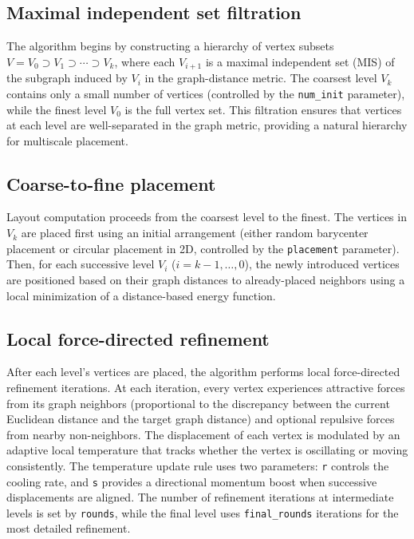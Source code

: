 \subsection{Maximal independent set filtration}\label{maximal-independent-set-filtration}

The algorithm begins by constructing a hierarchy of vertex subsets
\(V = V_0 \supset V_1 \supset \cdots \supset V_k\), where each \(V_{i+1}\) is a
maximal independent set (MIS) of the subgraph induced by \(V_i\) in the
graph-distance metric. The coarsest level \(V_k\) contains only a small number
of vertices (controlled by the \texttt{num\_init} parameter), while the finest level
\(V_0\) is the full vertex set. This filtration ensures that vertices at each
level are well-separated in the graph metric, providing a natural hierarchy
for multiscale placement.

\subsection{Coarse-to-fine placement}\label{coarse-to-fine-placement}

Layout computation proceeds from the coarsest level to the finest. The
vertices in \(V_k\) are placed first using an initial arrangement (either
random barycenter placement or circular placement in 2D, controlled by the
\texttt{placement} parameter). Then, for each successive level \(V_i\) (\(i = k-1,
\ldots, 0\)), the newly introduced vertices are positioned based on their
graph distances to already-placed neighbors using a local minimization of a
distance-based energy function.

\subsection{Local force-directed refinement}\label{local-force-directed-refinement}

After each level's vertices are placed, the algorithm performs local
force-directed refinement iterations. At each iteration, every vertex
experiences attractive forces from its graph neighbors (proportional to the
discrepancy between the current Euclidean distance and the target graph
distance) and optional repulsive forces from nearby non-neighbors. The
displacement of each vertex is modulated by an adaptive local temperature
that tracks whether the vertex is oscillating or moving consistently. The
temperature update rule uses two parameters: \texttt{r} controls the cooling rate,
and \texttt{s} provides a directional momentum boost when successive displacements
are aligned. The number of refinement iterations at intermediate levels is
set by \texttt{rounds}, while the final level uses \texttt{final\_rounds} iterations for
the most detailed refinement.

